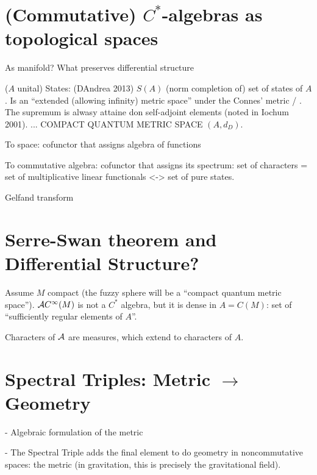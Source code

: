 \linea

\section{(Commutative) $C^*$-algebras as topological spaces}

As manifold? What preserves differential structure

($A$ unital) States: (DAndrea 2013) $S(A)$ (norm completion of) set of states of $A$. Is an ``extended (allowing infinity) metric space'' under the Connes' metric / . The supremum is alwasy attaine don self-adjoint elements (noted in Iochum 2001). ... COMPACT QUANTUM METRIC SPACE $(A,  d_{D})$.

To space: cofunctor that assigns algebra of functions

To commutative algebra: cofunctor that assigns its spectrum: set of characters = set of multiplicative linear functionals <-> set of pure states.

Gelfand transform

\section{Serre-Swan theorem and Differential Structure?}

Assume $M$ compact (the fuzzy sphere will be a ``compact quantum metric space''). $\mathcal A C^\infty(M)$ is not a $C^*$ algebra, but it is dense in $A = C(M)$: set of ``sufficiently regular elements of $A$''.

Characters of $\mathcal A$ are measures, which extend to characters of $A$.

\section{Spectral Triples: Metric $\to$ Geometry}

 - Algebraic formulation of the metric

 - The Spectral Triple adds the final element to do geometry in noncommutative spaces: the metric (in gravitation, this is precisely the gravitational field).
 
